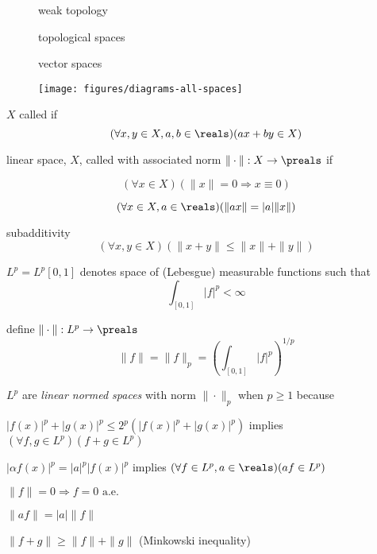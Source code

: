 \documentclass[17pt,landscape]{foils}
\begin{document}
{{\begin{figure}
\begin{center}
		{weak topology}

		{topological spaces}

		{vector spaces}

	\texttt{[image: figures/diagrams-all-spaces]}%
		\label{fig:diagrams for relations among various spaces}
\end{center}
\end{figure}
\vfill




\bit
	\item $X$ called  if
	\[
		(\forall x, y \in X, a, b \in \reals)(ax + by \in X)
	\]

	\vitem linear space, $X$, called  with associated norm $\|\cdot\|: X \to \preals$ if%
	\bit
		\item
		\[
			(\forall x\in X)(\|x\|=0 \Rightarrow x \equiv 0)
		\]
		\item
		\[
			(\forall x \in X, a \in \reals)(\|ax\| = |a|\|x\|)
		\]
		\item subadditivity
		\[
			(\forall x,y\in X)(\|x+y\| \leq \|x\| + \|y\|)
		\]
	\eit
\eit




\bit
\item
	$L^p = L^p[0,1]$ denotes space of (Lebesgue) measurable functions such that%
	\[
		\int_{[0,1]} |f|^p < \infty
	\]

\vitem
	define $\|\cdot\|:L^p\to\preals$
	\[
		\|f\| = \|f\|_p = \left(\int_{[0,1]} |f|^p\right)^{1/p}
	\]

\vitem
	$L^p$ are \emph{linear normed spaces} with norm $\|\cdot\|_p$ when $p\geq 1$ because
	\bit
	\item
		$|f(x)|^p + |g(x)|^p \leq 2^p(|f(x)|^p + |g(x)|^p)$ implies $(\forall f, g\in L^p)(f+g \in L^p)$
	\item
		$|\alpha f(x)|^p = |a|^p|f(x)|^p$ implies $(\forall f\in L^p, a \in \reals)(af \in L^p)$
	\item
		$\|f\|=0\Rightarrow f=0\mbox{ a.e.}$
	\item
		$\|a f\| = |a|\|f\|$
	\item
		$\|f+g\|\geq \|f\|+\|g\|$ (Minkowski inequality)
	\eit
\eit


}}
\end{document}
